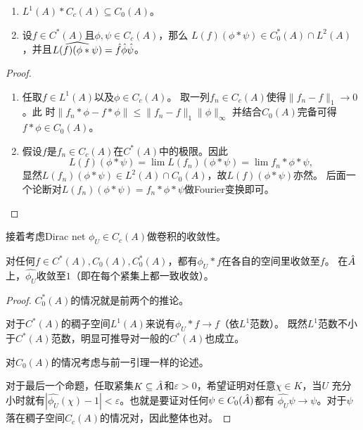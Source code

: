 \begin{lemma}
    \begin{enumerate}
        \item $L^1(A)*C_c(A) \subseteq C_0(A)$。
        \item 设$f \in C^*(A)$且$\phi,\psi \in C_c(A)$，那么
        $L(f)(\phi*\psi) \in C_0^*(A) \cap L^2(A)$，并且$\widehat{L(f)(\phi*\psi)} = \hat{f}\hat{\phi}\hat{\psi}$。
    \end{enumerate}
\end{lemma}
\begin{proof}
    \begin{enumerate}
        \item 任取$f \in L^1(A)$以及$\phi \in C_c(A)$。
        取一列$f_n \in C_c(A)$使得$\|f_n-f\|_1 \to 0$。此
        时$\|f_n*\phi - f*\phi\| \leqslant \|f_n-f\|_1\|\phi\|_\infty$
        并结合$C_0(A)$完备可得$f*\phi \in C_0(A)$。
        \item 假设$f$是$f_n \in C_c(A)$在$C^*(A)$中的极限。因此
        \[L(f)(\phi*\psi) = \lim L(f_n)(\phi*\psi) = \lim f_n*\phi*\psi,\]
        显然$L(f_n)(\phi*\psi) \in L^2(A) \cap C_0(A)$，故$L(f)(\phi*\psi)$亦然。
        后面一个论断对$L(f_n)(\phi*\psi) = f_n*\phi*\psi$做Fourier变换即可。\qedhere
    \end{enumerate}
\end{proof}

接着考虑Dirac net $\phi_U \in C_c(A)$做卷积的收敛性。
\begin{proposition}
    对任何$f \in C^*(A),C_0(A),C_0^*(A)$，都有$\phi_U*f$在各自的空间里收敛至$f$。
    在$\hat{A}$上，$\widehat{\phi_U}$收敛至$1$（即在每个紧集上都一致收敛）。
\end{proposition}
\begin{proof}
    $C_0^*(A)$的情况就是前两个的推论。

    对于$C^*(A)$的稠子空间$L^1(A)$来说有$\phi_U*f \to f$（依$L^1$范数）。
    既然$L^1$范数不小于$C^*(A)$范数，明显可推导对一般的$C^*(A)$也成立。

    对$C_0(A)$的情况考虑与前一引理一样的论述。

    对于最后一个命题，任取紧集$K \subseteq \hat{A}$和$\varepsilon > 0$，希望证明对任意$\chi \in K$，当$U$
    充分小时就有$|\widehat{\phi_U}(\chi) - 1|<\varepsilon$。也就是要证对任何$\psi \in C_0(\hat{A})$都有
    $\widehat{\phi_U}\psi \to \psi$。对于$\psi$落在稠子空间$\widehat{C_c(A)}$的情况对，因此整体也对。
\end{proof}

